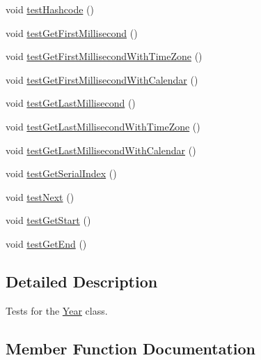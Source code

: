 \begin{DoxyCompactItemize}
\item 
void \mbox{\hyperlink{classorg_1_1jfree_1_1data_1_1time_1_1_year_test_a2a4bdab684eb4c9f92c80a2aeeb1ac31}{test\+Hashcode}} ()
\item 
void \mbox{\hyperlink{classorg_1_1jfree_1_1data_1_1time_1_1_year_test_a201a877e4135032a68891ff84041f2ed}{test\+Get\+First\+Millisecond}} ()
\item 
void \mbox{\hyperlink{classorg_1_1jfree_1_1data_1_1time_1_1_year_test_a88424b2c45145458f032f78726dddd9b}{test\+Get\+First\+Millisecond\+With\+Time\+Zone}} ()
\item 
void \mbox{\hyperlink{classorg_1_1jfree_1_1data_1_1time_1_1_year_test_a7baf8e0e2d5320980775d6c5abb32036}{test\+Get\+First\+Millisecond\+With\+Calendar}} ()
\item 
void \mbox{\hyperlink{classorg_1_1jfree_1_1data_1_1time_1_1_year_test_a98d800e65be0b8270189195276b1ed6a}{test\+Get\+Last\+Millisecond}} ()
\item 
void \mbox{\hyperlink{classorg_1_1jfree_1_1data_1_1time_1_1_year_test_ae067b2c5e44ce04d9be0a71bb4f652a5}{test\+Get\+Last\+Millisecond\+With\+Time\+Zone}} ()
\item 
void \mbox{\hyperlink{classorg_1_1jfree_1_1data_1_1time_1_1_year_test_a1c1bde8966dac737359b3be7e383b3d6}{test\+Get\+Last\+Millisecond\+With\+Calendar}} ()
\item 
void \mbox{\hyperlink{classorg_1_1jfree_1_1data_1_1time_1_1_year_test_acf4fef53587b9868eabad80eaf5004c4}{test\+Get\+Serial\+Index}} ()
\item 
void \mbox{\hyperlink{classorg_1_1jfree_1_1data_1_1time_1_1_year_test_ab893e0e17950c38957cd7000a2c919d0}{test\+Next}} ()
\item 
void \mbox{\hyperlink{classorg_1_1jfree_1_1data_1_1time_1_1_year_test_a5caf163a2c262792c9b43cbf1db77b88}{test\+Get\+Start}} ()
\item 
void \mbox{\hyperlink{classorg_1_1jfree_1_1data_1_1time_1_1_year_test_a4664363f17945a9f30033caf2b8e46e7}{test\+Get\+End}} ()
\end{DoxyCompactItemize}


\subsection{Detailed Description}
Tests for the \mbox{\hyperlink{classorg_1_1jfree_1_1data_1_1time_1_1_year}{Year}} class. 

\subsection{Member Function Documentation}
\mbox{\label{classorg_1_1jfree_1_1data_1_1time_1_1_year_test_ac7c6cfc5bc25483114de1ef6d44699c6}} 
